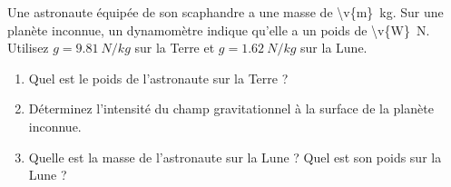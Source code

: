 Une astronaute équipée de son scaphandre a une masse de \qty{\v{m}}{kg}. Sur une planète inconnue, un dynamomètre indique qu'elle a un poids de \qty{\v{W}}{N}. Utilisez $g = \qty{9.81}{N/kg}$ sur la Terre et $g = \qty{1.62}{N/kg}$ sur la Lune.

\begin{enumerate}[label=\alph*)]
    \item Quel est le poids de l'astronaute sur la Terre ?
    \item Déterminez l'intensité du champ gravitationnel à la surface de la planète inconnue.
    \item Quelle est la masse de l'astronaute sur la Lune ? Quel est son poids sur la Lune ?
\end{enumerate}
